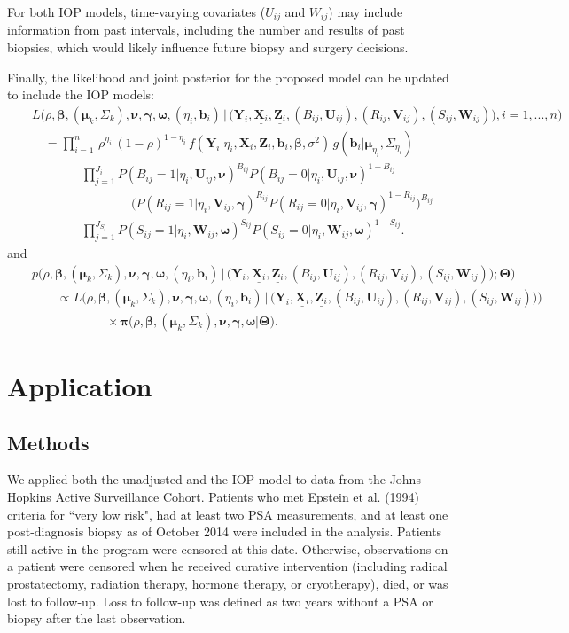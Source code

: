 \documentclass[12pt, letterpaper]{article}
\newcommand{\bmbeta}{\boldsymbol{\beta}}
\newcommand{\bmpi}{\boldsymbol{\pi}}
\newcommand{\bmnu}{\boldsymbol{\nu}}
\newcommand{\bmmu}{\boldsymbol{\mu}}
\newcommand{\bmgamma}{\boldsymbol{\gamma}}
\newcommand{\bmomega}{\boldsymbol{\omega}}
\newcommand{\bmY}{\mathbf{Y}}
\newcommand{\bmZ}{\mathbf{Z}}
\newcommand{\bmX}{\mathbf{X}}
\newcommand{\bmV}{\mathbf{V}}
\newcommand{\bmW}{\mathbf{W}}
\newcommand{\bmU}{\mathbf{U}}
\newcommand{\bmb}{\mathbf{b}}
\newcommand{\bmTheta}{\boldsymbol{\Theta}}
\newcommand{\bea}{\begin{eqnarray}}
\newcommand{\eea}{\end{eqnarray}}
\newcommand{\mydots}{...}
\begin{document}
For both IOP models, time-varying covariates ($U_{ij}$ and $W_{ij}$) may include information from past intervals, including the number and results of past biopsies, which would likely influence future biopsy and surgery decisions.


Finally, the likelihood and joint posterior for the proposed model can be updated to include the IOP models:
\bea
&&L\Big(\rho, \bmbeta, (\bmmu_k, \Sigma_k), \bmnu, \bmgamma, \bmomega, (\eta_i, \bmb_i)  \, | \,\big( \bmY_i, \underline{\bmX_i}, \underline{\bmZ_i}, (B_{ij}, \bmU_{ij}), (R_{ij}, \bmV_{ij}), (S_{ij}, \bmW_{ij}) \big), i=1,\mydots,n \Big) \nonumber \\
&& \quad =  \prod_{i=1}^{n}  \,  \rho^{\eta_i}\,(1-\rho)^{1-\eta_i}\, f(\bmY_i | \eta_i, \underline{\bmX_i}, \underline{\bmZ_i}, \bmb_i, \bmbeta, \sigma^2) \, g(\bmb_i |  \bmmu_{\eta_i}, \Sigma_{\eta_i})  \nonumber \\
&& \qquad \qquad \prod_{j=1}^{J_i}  P(B_{ij}=1 | \eta_i, \bmU_{ij}, \bmnu) ^{B_{ij}} P(B_{ij}=0 | \eta_i, \bmU_{ij}, \bmnu)^{1-B_{ij}}  \nonumber \\
&& \qquad \qquad \qquad  \qquad \big(P(R_{ij}=1 | \eta_i, \bmV_{ij}, \bmgamma) ^{R_{ij}} P(R_{ij}=0 | \eta_i, \bmV_{ij}, \bmgamma)^{1-R_{ij}} \big)^{B_{ij}} \nonumber \\
\label{eq:lik-inf}
&& \qquad \qquad  \prod_{j=1}^{J_{S_i}}  P(S_{ij}=1 | \eta_i, \bmW_{ij}, \bmomega) ^{S_{ij}} P(S_{ij}=0 | \eta_i, \bmW_{ij}, \bmomega)^{1-S_{ij}} .
\eea
and 
\bea
&& p\Big(\rho, \bmbeta, (\bmmu_k,\Sigma_k), \bmnu, \bmgamma, \bmomega, (\eta_i,\bmb_i) \,| \, \big( \bmY_i, \underline{\bmX_i}, \underline{\bmZ_i}, (B_{ij}, \bmU_{ij}), (R_{ij}, \bmV_{ij}), (S_{ij}, \bmW_{ij}) \big); \bmTheta\Big) \nonumber\\
&&\qquad  \propto L\Big(\rho,  \bmbeta, (\bmmu_k, \Sigma_k), \bmnu, \bmgamma, \bmomega, (\eta_i, \bmb_i)  \, | \,\big(\bmY_i, \underline{\bmX_i}, \underline{\bmZ_i},(B_{ij}, \bmU_{ij}), (R_{ij}, \bmV_{ij}), (S_{ij}, \bmW_{ij})\big) \Big)\nonumber\\
\label{eq:post-inf}
&& \qquad \qquad \qquad \times \bmpi\big(\rho,\bmbeta, (\bmmu_k, \Sigma_k), \bmnu, \bmgamma, \bmomega |\bmTheta\big).
\eea


\section{Application}
\subsection{Methods}
We applied both the unadjusted and the IOP model to data from the Johns Hopkins Active Surveillance Cohort. Patients who met Epstein et al. (1994) criteria for ``very low risk", had at least two PSA measurements, and at least one post-diagnosis biopsy as of October 2014 were included in the analysis. Patients still active in the program were censored at this date. Otherwise, observations on a patient were censored when he received curative intervention (including radical prostatectomy, radiation therapy, hormone therapy, or cryotherapy), died, or was lost to follow-up. Loss to follow-up was defined as two years without a PSA  or biopsy after the last observation. 
\end{document}
